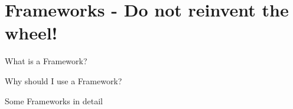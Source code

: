 \section{Frameworks - Do not reinvent the wheel!}
\begin{frame}{What is a Framework?}
\end{frame}

\begin{frame}{Why should I use a Framework?}
\end{frame}

\begin{frame}{Some Frameworks in detail}
\end{frame}